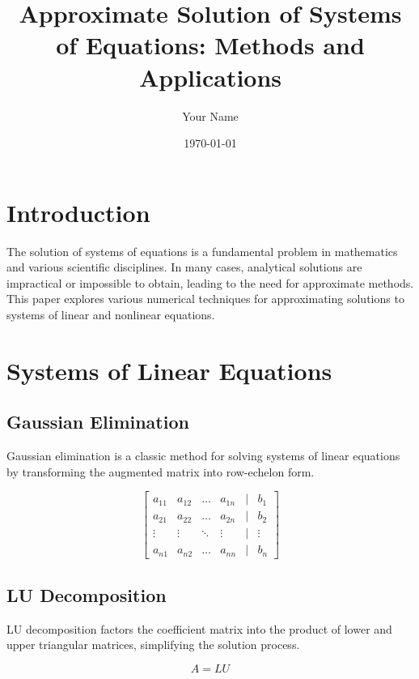 \documentclass{article}
\title{Approximate Solution of Systems of Equations: Methods and Applications}
\author{Your Name}
\date{\today}
\begin{document}
\maketitle

\section{Introduction}

The solution of systems of equations is a fundamental problem in mathematics and various scientific disciplines. In many cases, analytical solutions are impractical or impossible to obtain, leading to the need for approximate methods. This paper explores various numerical techniques for approximating solutions to systems of linear and nonlinear equations.

\section{Systems of Linear Equations}

\subsection{Gaussian Elimination}

Gaussian elimination is a classic method for solving systems of linear equations by transforming the augmented matrix into row-echelon form.

\begin{equation}
    \begin{bmatrix}
        a_{11} & a_{12} & \dots & a_{1n} & | & b_1 \\
        a_{21} & a_{22} & \dots & a_{2n} & | & b_2 \\
        \vdots & \vdots & \ddots & \vdots & | & \vdots \\
        a_{n1} & a_{n2} & \dots & a_{nn} & | & b_n
    \end{bmatrix}
\end{equation}

\subsection{LU Decomposition}

LU decomposition factors the coefficient matrix into the product of lower and upper triangular matrices, simplifying the solution process.

\begin{equation}
    A = LU
\end{equation}
\end{document}
